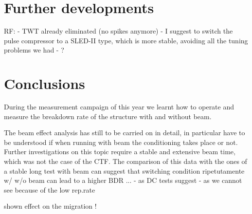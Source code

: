 \section[Further developments]{Further developments}


RF:
- TWT already eliminated (no spikes anymore)
- I suggest to switch the pulse compressor to a SLED-II type, which is more stable, avoiding all the tuning problems we had
- ?


\section{Conclusions}

During the measurement campaign of this year we learnt how to operate and measure the breakdown rate of the structure with and without beam.

The beam effect analysis has still to be carried on in detail, in particular have to be understood if when running with beam the conditioning takes place or not. Further investigations on this topic require a stable and extensive beam time, which was not the case of the CTF. The comparison of this data with the ones of a stable long test with beam can suggest that switching condition ripetutamente w/ w/o beam can lead to a higher BDR ...
- as DC tests suggest
- as we cannot see because of the low rep.rate



shown effect on the migration !